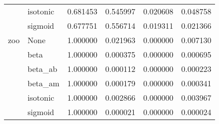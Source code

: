 \begin{tabular}{llrrrr}
        & isotonic &  0.681453 &  0.545997 &  0.020608 &  0.048758 \\
        & sigmoid &  0.677751 &  0.556714 &  0.019311 &  0.021366 \\
zoo & None &  1.000000 &  0.021963 &  0.000000 &  0.007130 \\
        & beta &  1.000000 &  0.000375 &  0.000000 &  0.000695 \\
        & beta\_ab &  1.000000 &  0.000112 &  0.000000 &  0.000223 \\
        & beta\_am &  1.000000 &  0.000179 &  0.000000 &  0.000341 \\
        & isotonic &  1.000000 &  0.002866 &  0.000000 &  0.003967 \\
        & sigmoid &  1.000000 &  0.000021 &  0.000000 &  0.000024 \\
\bottomrule
\end{tabular}

